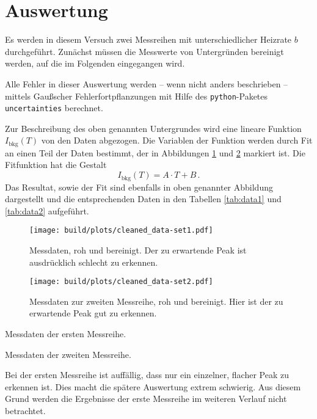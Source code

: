 \section{Auswertung}
\label{sec:auswertung}
Es werden in diesem Versuch zwei Messreihen mit unterschiedlicher Heizrate
$b$ durchgeführt. Zunächst müssen die Messwerte von Untergründen bereinigt
werden, auf die im Folgenden eingegangen wird.

Alle Fehler in dieser Auswertung werden -- wenn nicht anders beschrieben --
mittels Gaußscher Fehlerfortpflanzungen mit Hilfe des \texttt{python}-Paketes
\texttt{uncertainties} \cite{py-uncertainties} berechnet.

Zur Beschreibung des oben genannten Untergrundes wird eine lineare Funktion
$I_\text{bkg}(T)$ von den Daten abgezogen. Die Variablen der Funktion werden
durch Fit an einen Teil der Daten bestimmt, der in Abbildungen
\ref{fig:data-a} und \ref{fig:data-b} markiert ist.
Die Fitfunktion hat die Gestalt
\begin{equation*}
    I_\text{bkg}(T) = A\cdot T + B\,.
\end{equation*}
Das Resultat, sowie der Fit sind ebenfalls in oben genannter Abbildung
dargestellt und die entsprechenden Daten in den Tabellen \ref{tab:data1} und
\ref{tab:data2} aufgeführt.
\begin{figure}
    \centering
    \texttt{[image: build/plots/cleaned\_data-set1.pdf]}
    \caption{Messdaten, roh und bereinigt. Der zu erwartende Peak ist
    ausdrücklich schlecht zu erkennen.}
    \label{fig:data-a}
\end{figure}
\begin{figure}
    \centering
    \texttt{[image: build/plots/cleaned\_data-set2.pdf]}
    \caption{Messdaten zur zweiten Messreihe, roh und bereinigt. Hier ist
    der zu erwartende Peak gut zu erkennen.}
    \label{fig:data-b}
\end{figure}
\begin{table}
    \centering
    \caption{Messdaten der ersten Messreihe.}
    \label{tab:data1}
    
\end{table}
\begin{table}
    \centering
    \caption{Messdaten der zweiten Messreihe.}
    \label{tab:data2}
    
\end{table}
Bei der ersten Messreihe ist auffällig, dass nur ein einzelner, flacher Peak
zu erkennen ist. Dies macht die spätere Auswertung extrem schwierig.
Aus diesem Grund werden die Ergebnisse der erste Messreihe im weiteren
Verlauf nicht betrachtet.

